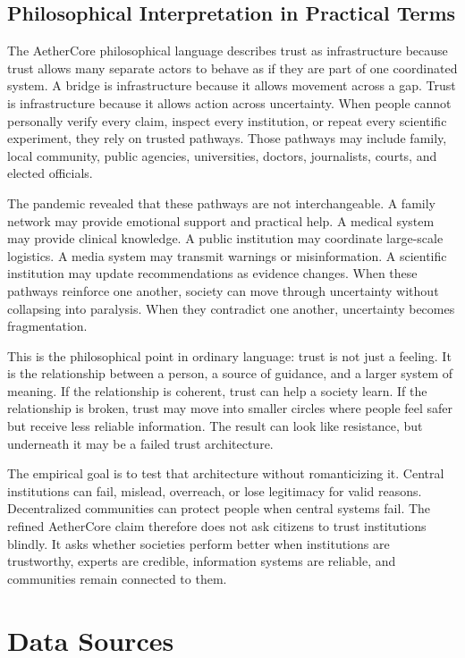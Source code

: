 \documentclass[12pt]{article}
\begin{document}
\subsection{Philosophical Interpretation in Practical Terms}

The AetherCore philosophical language describes trust as infrastructure because trust allows many separate actors to behave as if they are part of one coordinated system. A bridge is infrastructure because it allows movement across a gap. Trust is infrastructure because it allows action across uncertainty. When people cannot personally verify every claim, inspect every institution, or repeat every scientific experiment, they rely on trusted pathways. Those pathways may include family, local community, public agencies, universities, doctors, journalists, courts, and elected officials.

The pandemic revealed that these pathways are not interchangeable. A family network may provide emotional support and practical help. A medical system may provide clinical knowledge. A public institution may coordinate large-scale logistics. A media system may transmit warnings or misinformation. A scientific institution may update recommendations as evidence changes. When these pathways reinforce one another, society can move through uncertainty without collapsing into paralysis. When they contradict one another, uncertainty becomes fragmentation.

This is the philosophical point in ordinary language: trust is not just a feeling. It is the relationship between a person, a source of guidance, and a larger system of meaning. If the relationship is coherent, trust can help a society learn. If the relationship is broken, trust may move into smaller circles where people feel safer but receive less reliable information. The result can look like resistance, but underneath it may be a failed trust architecture.

The empirical goal is to test that architecture without romanticizing it. Central institutions can fail, mislead, overreach, or lose legitimacy for valid reasons. Decentralized communities can protect people when central systems fail. The refined AetherCore claim therefore does not ask citizens to trust institutions blindly. It asks whether societies perform better when institutions are trustworthy, experts are credible, information systems are reliable, and communities remain connected to them.

\section{Data Sources}
\end{document}
